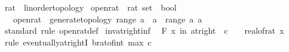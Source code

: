 \begin{isabellebody}
\isanewline
{}\isamarkupfalse%
\ rat\ {\isacharcolon}{\kern0pt}{\isacharcolon}{\kern0pt}\ linorder{\isacharunderscore}{\kern0pt}topology\isanewline
{}\isanewline
\isanewline
{}\isamarkupfalse%
\ open{\isacharunderscore}{\kern0pt}rat\ {\isacharcolon}{\kern0pt}{\isacharcolon}{\kern0pt}\ {\isachardoublequoteopen}rat\ set\ {\isasymRightarrow}\ bool{\isachardoublequoteclose}\isanewline
\ \ \ {\isachardoublequoteopen}open{\isacharunderscore}{\kern0pt}rat\ {\isacharequal}{\kern0pt}\ generate{\isacharunderscore}{\kern0pt}topology\ {\isacharparenleft}{\kern0pt}range\ {\isacharparenleft}{\kern0pt}{\isasymlambda}a{\isachardot}{\kern0pt}\ {\isacharbraceleft}{\kern0pt}{\isachardot}{\kern0pt}{\isachardot}{\kern0pt}{\isacharless}{\kern0pt}\ a{\isacharbraceright}{\kern0pt}{\isacharparenright}{\kern0pt}\ {\isasymunion}\ range\ {\isacharparenleft}{\kern0pt}{\isasymlambda}a{\isachardot}{\kern0pt}\ {\isacharbraceleft}{\kern0pt}a\ {\isacharless}{\kern0pt}{\isachardot}{\kern0pt}{\isachardot}{\kern0pt}{\isacharbraceright}{\kern0pt}{\isacharparenright}{\kern0pt}{\isacharparenright}{\kern0pt}{\isachardoublequoteclose}\isanewline
\isanewline
{}\isamarkupfalse%
\isanewline
%
\isadelimproof
\ \ %
\endisadelimproof
%
\isatagproof
{}\isamarkupfalse%
\ standard\ {\isacharparenleft}{\kern0pt}rule\ open{\isacharunderscore}{\kern0pt}rat{\isacharunderscore}{\kern0pt}def{\isacharparenright}{\kern0pt}%
\endisatagproof
{\isafoldproof}%
%
\isadelimproof
\isanewline
%
\endisadelimproof
{}\isamarkupfalse%
\isanewline
\isanewline
{}\isamarkupfalse%
\ inv{\isacharunderscore}{\kern0pt}at{\isacharunderscore}{\kern0pt}right{\isacharunderscore}{\kern0pt}{}{\isacharunderscore}{\kern0pt}inf{\isacharcolon}{\kern0pt}\isanewline
\ \ {\isachardoublequoteopen}{\isasymforall}\isactrlsub F\ x\ in\ at{\isacharunderscore}{\kern0pt}right\ {}{\isachardot}{\kern0pt}\ c\ {\isasymle}\ {}\ {\isacharslash}{\kern0pt}\ real{\isacharunderscore}{\kern0pt}of{\isacharunderscore}{\kern0pt}rat\ x{\isachardoublequoteclose}\isanewline
%
\isadelimproof
\ \ %
\endisadelimproof
%
\isatagproof
{}\isamarkupfalse%
\ {\isacharparenleft}{\kern0pt}rule\ eventually{\isacharunderscore}{\kern0pt}at{\isacharunderscore}{\kern0pt}rightI{\isacharbrackleft}{\kern0pt}\ b{\isacharequal}{\kern0pt}{\isachardoublequoteopen}{}{\isacharslash}{\kern0pt}rat{\isacharunderscore}{\kern0pt}of{\isacharunderscore}{\kern0pt}int\ {\isacharparenleft}{\kern0pt}max\ {\isasymlceil}c{\isasymrceil}\ {}{\isacharparenright}{\kern0pt}{\isachardoublequoteclose}{\isacharbrackright}{\kern0pt}{\isacharparenright}{\kern0pt}\isanewline

\end{isabellebody}

